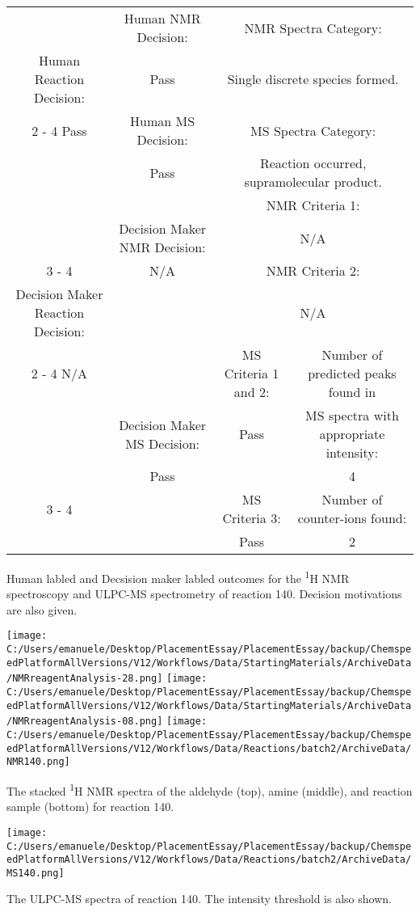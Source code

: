 \documentclass{article}%
\begin{document}
\begin{Decision Table}[H]%
\begin{tabular}{|c|c|c|c|}%
\hline%
&Human NMR Decision:&\multicolumn{2}{|c|}{NMR Spectra Category:}\\%
Human Reaction Decision:&Pass&\multicolumn{2}{|c|}{Single discrete species formed.}\\%
\cline{2%
-%
4}%
Pass&Human MS Decision:&\multicolumn{2}{|c|}{MS Spectra Category:}\\%
&Pass&\multicolumn{2}{|c|}{Reaction occurred, supramolecular product.}\\%
\hline%
&&\multicolumn{2}{|c|}{NMR Criteria 1:}\\%
&Decision Maker NMR Decision:&\multicolumn{2}{|c|}{N/A}\\%
\cline{3%
-%
4}%
&N/A&\multicolumn{2}{|c|}{NMR Criteria 2:}\\%
Decision Maker Reaction Decision:&&\multicolumn{2}{|c|}{N/A}\\%
\cline{2%
-%
4}%
N/A&&MS Criteria 1 and 2:&Number of predicted peaks found in\\%
&Decision Maker MS Decision:&Pass&MS spectra with appropriate intensity:\\%
&Pass&&4\\%
\cline{3%
-%
4}%
&&MS Criteria 3:&Number of counter{-}ions found:\\%
&&Pass&2\\%
\hline%
\end{tabular}%
\caption{Human labled and Decsision maker labled outcomes for the \textsuperscript{1}H NMR spectroscopy and ULPC-MS spectrometry of reaction 140. Decision motivations are also given.}%
\end{Decision Table}%
\begin{NMR Spectra}[H]%
\begin{center}%
\texttt{[image: C:/Users/emanuele/Desktop/PlacementEssay/PlacementEssay/backup/ChemspeedPlatformAllVersions/V12/Workflows/Data/StartingMaterials/ArchiveData/NMRreagentAnalysis-28.png]}\hfill%
\texttt{[image: C:/Users/emanuele/Desktop/PlacementEssay/PlacementEssay/backup/ChemspeedPlatformAllVersions/V12/Workflows/Data/StartingMaterials/ArchiveData/NMRreagentAnalysis-08.png]}\hfill%
\texttt{[image: C:/Users/emanuele/Desktop/PlacementEssay/PlacementEssay/backup/ChemspeedPlatformAllVersions/V12/Workflows/Data/Reactions/batch2/ArchiveData/NMR140.png]}\hfill%
\end{center}%
\caption{The stacked \textsuperscript{1}H NMR spectra of the aldehyde (top), amine (middle), and reaction sample (bottom) for reaction 140.}%
\end{NMR Spectra}%
\begin{MS Spectra}[H]%
\begin{center}%
\texttt{[image: C:/Users/emanuele/Desktop/PlacementEssay/PlacementEssay/backup/ChemspeedPlatformAllVersions/V12/Workflows/Data/Reactions/batch2/ArchiveData/MS140.png]}\hfill%
\end{center}%
\caption{The ULPC-MS spectra of reaction 140. The intensity threshold is also shown.}%
\end{MS Spectra}%
\end{document}
